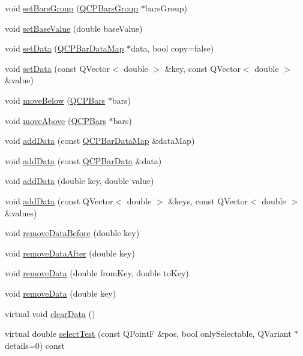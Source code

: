 \begin{DoxyCompactItemize}
\item 
void \mbox{\hyperlink{class_q_c_p_bars_aedd1709061f0b307c47ddb45e172ef9a}{set\+Bars\+Group}} (\mbox{\hyperlink{class_q_c_p_bars_group}{Q\+C\+P\+Bars\+Group}} $\ast$bars\+Group)
\item 
void \mbox{\hyperlink{class_q_c_p_bars_a574ec7eb7537566df1a28ff085d75623}{set\+Base\+Value}} (double base\+Value)
\item 
void \mbox{\hyperlink{class_q_c_p_bars_aa3435aab19e0a49e4e7b41bd36a8d96b}{set\+Data}} (\mbox{\hyperlink{qcustomplot_8h_aa846c77472cae93def9f1609d0c57191}{Q\+C\+P\+Bar\+Data\+Map}} $\ast$data, bool copy=false)
\item 
void \mbox{\hyperlink{class_q_c_p_bars_a3efded5df4a82ecb201f7c28099fa2e5}{set\+Data}} (const Q\+Vector$<$ double $>$ \&key, const Q\+Vector$<$ double $>$ \&value)
\item 
void \mbox{\hyperlink{class_q_c_p_bars_a69fc371346980f19177c3d1ecdad78ee}{move\+Below}} (\mbox{\hyperlink{class_q_c_p_bars}{Q\+C\+P\+Bars}} $\ast$bars)
\item 
void \mbox{\hyperlink{class_q_c_p_bars_ac22e00a6a41509538c21b04f0a57318c}{move\+Above}} (\mbox{\hyperlink{class_q_c_p_bars}{Q\+C\+P\+Bars}} $\ast$bars)
\item 
void \mbox{\hyperlink{class_q_c_p_bars_a1f29cf08615040993209147fa68de3f2}{add\+Data}} (const \mbox{\hyperlink{qcustomplot_8h_aa846c77472cae93def9f1609d0c57191}{Q\+C\+P\+Bar\+Data\+Map}} \&data\+Map)
\item 
void \mbox{\hyperlink{class_q_c_p_bars_a142158b1addefd53259002dd3ab22c3a}{add\+Data}} (const \mbox{\hyperlink{class_q_c_p_bar_data}{Q\+C\+P\+Bar\+Data}} \&data)
\item 
void \mbox{\hyperlink{class_q_c_p_bars_a684dd105403a5497fda42f2094fecbb7}{add\+Data}} (double key, double value)
\item 
void \mbox{\hyperlink{class_q_c_p_bars_a3679a0a9decab0fa03f8f4c6e3344d52}{add\+Data}} (const Q\+Vector$<$ double $>$ \&keys, const Q\+Vector$<$ double $>$ \&values)
\item 
void \mbox{\hyperlink{class_q_c_p_bars_a9d12779a3fad4820aad2c428f368298d}{remove\+Data\+Before}} (double key)
\item 
void \mbox{\hyperlink{class_q_c_p_bars_a99de6e7abbbf03fb41fa604c7f08aa8b}{remove\+Data\+After}} (double key)
\item 
void \mbox{\hyperlink{class_q_c_p_bars_a1fe9bcb57d670defea1bb65cadf43765}{remove\+Data}} (double from\+Key, double to\+Key)
\item 
void \mbox{\hyperlink{class_q_c_p_bars_a837cc9848ad3edd40a6130b508493f93}{remove\+Data}} (double key)
\item 
virtual void \mbox{\hyperlink{class_q_c_p_bars_a11dbbd707132f07f862dff13c5789c2b}{clear\+Data}} ()
\item 
virtual double \mbox{\hyperlink{class_q_c_p_bars_a62d66cc8eedca6bedfc1f6513164d418}{select\+Test}} (const Q\+PointF \&pos, bool only\+Selectable, Q\+Variant $\ast$details=0) const
\end{DoxyCompactItemize}
